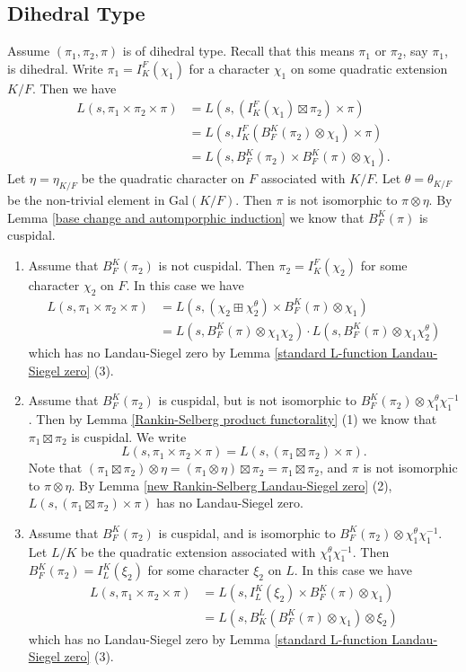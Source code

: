 \documentclass[12pt]{amsart}
\begin{document}
\subsection{Dihedral Type}
Assume $(\pi_1,\pi_2,\pi)$ is of dihedral type. Recall that this means $\pi_1$ or $\pi_2$, say $\pi_1$, is dihedral. Write $\pi_1 = I_K^F(\chi_1)$ for a character $\chi_1$ on some quadratic extension $K/F$. Then we have 
\begin{align*}
    L(s,\pi_1 \times \pi_2 \times \pi) &= L(s,(I_K^F(\chi_1) \boxtimes \pi_2) \times \pi) \\
    &= L(s,I_K^F(B_F^K(\pi_2) \otimes \chi_1) \times \pi) \\
    &= L(s,B_F^K(\pi_2) \times B_F^K(\pi) \otimes \chi_1).
\end{align*}
Let $\eta = \eta_{K/F}$ be the quadratic character on $F$ associated with $K/F$. Let $\theta = \theta_{K/F}$ be the non-trivial element in Gal$(K/F)$. Then $\pi$ is not isomorphic to $\pi \otimes \eta$. By Lemma \ref{base change and automporphic induction} we know that $B_F^K(\pi)$ is cuspidal. 
\begin{enumerate}
    \item Assume that $B_F^K(\pi_2)$ is not cuspidal. Then $\pi_2 = I_K^F(\chi_2)$ for some character $\chi_2$ on $F$. In this case we have 
    \begin{align*}
        L(s,\pi_1 \times \pi_2 \times \pi) &= L(s,(\chi_2 \boxplus \chi_2^\theta) \times B_F^K(\pi) \otimes \chi_1) \\
        &= L(s,B_F^K(\pi) \otimes \chi_1\chi_2) \cdot L(s,B_F^K(\pi) \otimes \chi_1\chi_2^\theta)
    \end{align*}
    which has no Landau-Siegel zero by Lemma \ref{standard L-function Landau-Siegel zero} (3).
    \item Assume that $B_F^K(\pi_2)$ is cuspidal, but is not isomorphic to $B_F^K(\pi_2) \otimes \chi_1^\theta\chi_1^{-1}$. Then by Lemma \ref{Rankin-Selberg product functorality} (1) we know that $\pi_1 \boxtimes \pi_2$ is cuspidal. We write 
    $$L(s,\pi_1 \times \pi_2 \times \pi) = L(s,(\pi_1 \boxtimes \pi_2) \times \pi).$$
    Note that $(\pi_1 \boxtimes \pi_2) \otimes \eta = (\pi_1 \otimes \eta) \boxtimes \pi_2 = \pi_1 \boxtimes \pi_2$, and $\pi$ is not isomorphic to $\pi \otimes \eta$. By Lemma \ref{new Rankin-Selberg Landau-Siegel zero} (2), $L(s,(\pi_1 \boxtimes \pi_2) \times \pi)$ has no Landau-Siegel zero.
    \item Assume that $B_F^K(\pi_2)$ is cuspidal, and is isomorphic to $B_F^K(\pi_2) \otimes \chi_1^\theta\chi_1^{-1}$. Let $L/K$ be the quadratic extension associated with $\chi_1^\theta\chi_1^{-1}$. Then $B_F^K(\pi_2) = I_L^K(\xi_2)$ for some character $\xi_2$ on $L$. In this case we have 
    \begin{align*}
        L(s,\pi_1 \times \pi_2 \times \pi) &= L(s,I_L^K(\xi_2) \times B_F^K(\pi) \otimes \chi_1) \\
        &= L(s,B_K^L(B_F^K(\pi) \otimes \chi_1) \otimes \xi_2)
    \end{align*}
    which has no Landau-Siegel zero by Lemma \ref{standard L-function Landau-Siegel zero} (3).
\end{enumerate}
\end{document}
